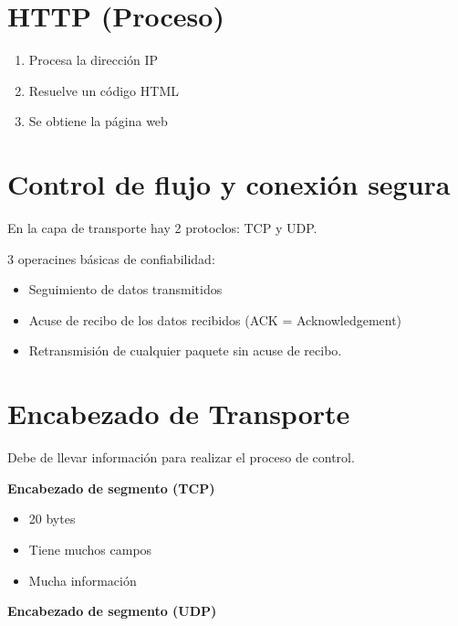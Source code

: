 \documentclass{article}
\begin{document}
\section{HTTP (Proceso)}

\begin{enumerate}
	\item
	Procesa la dirección IP
	\item
	Resuelve un código HTML
	\item
	Se obtiene la página web
\end{enumerate}

\section{Control de flujo y conexión segura}

En la capa de transporte hay 2 protoclos: TCP y UDP.
\vspace{1em}

3 operacines básicas de confiabilidad:

\begin{itemize}
	\item
	Seguimiento de datos transmitidos
	\item
		Acuse de recibo de los datos recibidos (ACK = Acknowledgement)
	\item
	Retransmisión de cualquier paquete sin acuse de recibo.
\end{itemize}
\vspace{1em}

\section{Encabezado de Transporte}

Debe de llevar información para realizar el proceso de control.
\vspace{1em}

\textbf{Encabezado de segmento (TCP)}
\vspace{1em}

\begin{itemize}
	\item
	20 bytes
	\item
	Tiene muchos campos
	\item
	Mucha información
\end{itemize}
\vspace{1em}

\textbf{Encabezado de segmento (UDP)}
\vspace{1em}
\end{document}
